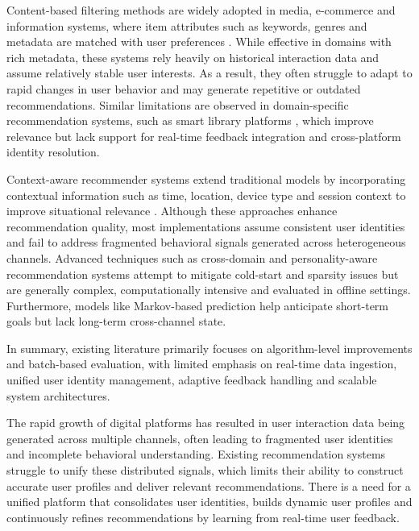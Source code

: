 \documentclass[conference]{IEEEtran}
\begin{document}
Content-based filtering methods are widely adopted in media, e-commerce and information systems, where item attributes such as keywords, genres and metadata are matched with user preferences \cite{sahu2022movie}. While effective in domains with rich metadata, these systems rely heavily on historical interaction data and assume relatively stable user interests. As a result, they often struggle to adapt to rapid changes in user behavior and may generate repetitive or outdated recommendations. Similar limitations are observed in domain-specific recommendation systems, such as smart library platforms \cite{liu2024design}, which improve relevance but lack support for real-time feedback integration and cross-platform identity resolution.

Context-aware recommender systems extend traditional models by incorporating contextual information such as time, location, device type and session context to improve situational relevance \cite{adomavicius2005context}. Although these approaches enhance recommendation quality, most implementations assume consistent user identities and fail to address fragmented behavioral signals generated across heterogeneous channels. Advanced techniques such as cross-domain \cite{li2023cdrec} and personality-aware \cite{dhelim2021personality} recommendation systems attempt to mitigate cold-start and sparsity issues but are generally complex, computationally intensive and evaluated in offline settings. Furthermore, models like Markov-based prediction \cite{awad2012prediction} help anticipate short-term goals but lack long-term cross-channel state.

In summary, existing literature primarily focuses on algorithm-level improvements and batch-based evaluation, with limited emphasis on real-time data ingestion, unified user identity management, adaptive feedback handling and scalable system architectures.

The rapid growth of digital platforms has resulted in user interaction data being generated across multiple channels, often leading to fragmented user identities and incomplete behavioral understanding. Existing recommendation systems struggle to unify these distributed signals, which limits their ability to construct accurate user profiles and deliver relevant recommendations. There is a need for a unified platform that consolidates user identities, builds dynamic user profiles and continuously refines recommendations by learning from real-time user feedback.
\end{document}
